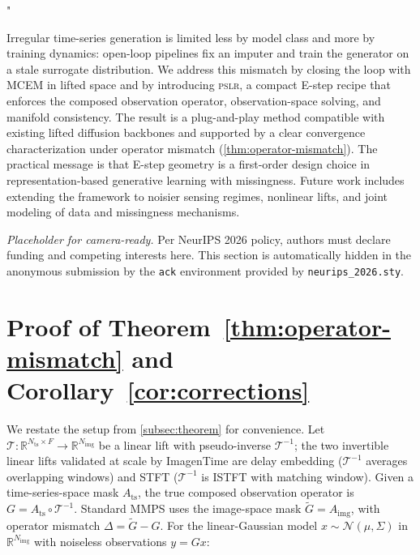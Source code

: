 "\documentclass{article}
\theoremstyle{plain}
\theoremstyle{definition}
\theoremstyle{remark}
\newcommand{\tsimg}{\mathcal{T}}
\newcommand{\imgts}{\mathcal{T}^{-1}}
\newcommand{\pslr}{\textsc{pslr}}
\newcommand{\Nts}{N_{\mathrm{ts}}}
\newcommand{\Nimg}{N_{\mathrm{img}}}
\newcommand{\Ats}{A_{\mathrm{ts}}}
\newcommand{\Aimg}{A_{\mathrm{img}}}
\begin{document}
Irregular time-series generation is limited less by model class and more by training dynamics: open-loop pipelines fix an imputer and train the generator on a stale surrogate distribution. We address this mismatch by closing the loop with MCEM in lifted space and by introducing \pslr{}, a compact E-step recipe that enforces the composed observation operator, observation-space solving, and manifold consistency. The result is a plug-and-play method compatible with existing lifted diffusion backbones and supported by a clear convergence characterization under operator mismatch (\cref{thm:operator-mismatch}). The practical message is that E-step geometry is a first-order design choice in representation-based generative learning with missingness. Future work includes extending the framework to noisier sensing regimes, nonlinear lifts, and joint modeling of data and missingness mechanisms.

\begin{ack}
\emph{Placeholder for camera-ready.} Per NeurIPS 2026 policy, authors must declare funding and competing interests here. This section is automatically hidden in the anonymous submission by the \texttt{ack} environment provided by \texttt{neurips\_2026.sty}.
\end{ack}

\clearpage




\clearpage
\appendix

\section{Proof of Theorem~\ref{thm:operator-mismatch} and Corollary~\ref{cor:corrections}}
\label{app:proof}

We restate the setup from \cref{subsec:theorem} for convenience. Let $\tsimg : \mathbb{R}^{\Nts \times F} \to \mathbb{R}^{\Nimg}$ be a linear lift with pseudo-inverse $\imgts$; the two invertible linear lifts validated at scale by ImagenTime are delay embedding ($\imgts$ averages overlapping windows) and STFT ($\imgts$ is ISTFT with matching window). Given a time-series-space mask $\Ats$, the true composed observation operator is $G = \Ats \circ \imgts$. Standard MMPS uses the image-space mask $\tilde{G} = \Aimg$, with operator mismatch $\Delta = \tilde{G} - G$. For the linear-Gaussian model $x \sim \mathcal{N}(\mu, \Sigma)$ in $\mathbb{R}^{\Nimg}$ with noiseless observations $y = Gx$:
\end{document}
